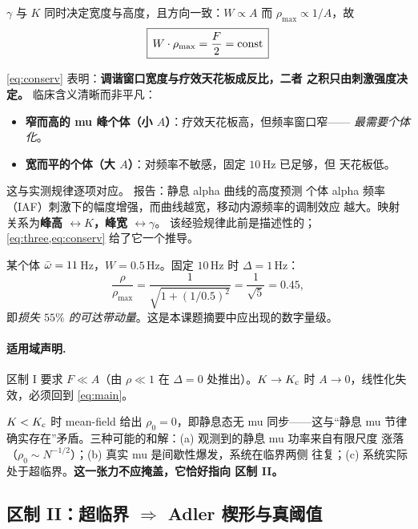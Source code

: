 $\gamma$ 与 $K$ 同时决定宽度与高度，且方向一致：$W\propto A$ 而
$\rho_{\max}\propto1/A$，故
%
\begin{equation}\label{eq:conserv}
\boxed{\,W\cdot\rho_{\max}=\frac{F}{2}=\text{const}\,}
\end{equation}

\noindent\cref{eq:conserv} 表明：\textbf{调谐窗口宽度与疗效天花板成反比，二者
之积只由刺激强度决定。} 临床含义清晰而非平凡：
%
\begin{itemize}[leftmargin=2em,itemsep=2pt]
\item \textbf{窄而高的 mu 峰个体（小 $A$）}：疗效天花板高，但频率窗口窄——
      \emph{最需要个体化}。
\item \textbf{宽而平的个体（大 $A$）}：对频率不敏感，固定 $10\,$Hz 已足够，但
      天花板低。
\end{itemize}

这与实测规律逐项对应。\citet{Trajkovic2024} 报告：静息 alpha 曲线的高度预测
个体 alpha 频率（IAF）刺激下的幅度增强，而曲线越宽，移动内源频率的调制效应
越大。映射关系为\textbf{峰高 $\leftrightarrow K$，峰宽 $\leftrightarrow\gamma$}。
该经验规律此前是描述性的；\cref{eq:three,eq:conserv} 给了它一个推导。

\begin{remark}[量化示例]\label{rem:quant}
某个体 $\bar{\omega}=11\,$Hz，$W=0.5\,$Hz。固定 $10\,$Hz 时 $\Delta=1\,$Hz：
%
\begin{equation*}
\frac{\rho}{\rho_{\max}}=\frac{1}{\sqrt{1+(1/0.5)^2}}=\frac{1}{\sqrt5}=0.45 ,
\end{equation*}
%
即\emph{损失 $55\%$ 的可达带动量}。这是本课题摘要中应出现的数字量级。
\end{remark}

\paragraph{适用域声明.}
区制 I 要求 $F\ll A$（由 $\rho\ll1$ 在 $\Delta=0$ 处推出）。$K\to K_{\mathrm{c}}$ 时
$A\to0$，线性化失效，必须回到 \cref{eq:main}。

\begin{remark}[一个需要诚实交代的张力]\label{rem:tension}
$K<K_{\mathrm{c}}$ 时 mean-field 给出 $\rho_0=0$，即静息态无 mu 同步——这与“静息 mu
节律确实存在”矛盾。三种可能的和解：(a) 观测到的静息 mu 功率来自有限尺度
涨落（$\rho_0\sim N^{-1/2}$）；(b) 真实 mu 是间歇性爆发，系统在临界两侧
往复；(c) 系统实际处于超临界。\textbf{这一张力不应掩盖，它恰好指向
区制 II。}
\end{remark}

\subsection{区制 II：超临界 $\Rightarrow$ Adler 楔形与真阈值}
\label{sec:regimeII}


